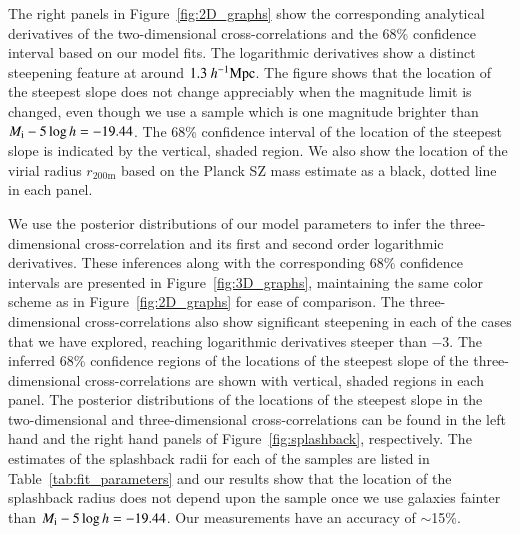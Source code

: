 \documentclass[iop, apjl, twocolappendix, numberedappendix]{emulateapj}
\def\mpch{h^{-1}{\rm Mpc}}
\begin{document}
The right panels in Figure~\ref{fig:2D_graphs} show the
corresponding analytical derivatives of the two-dimensional
cross-correlations and the 68\% confidence interval based on our
model fits. The logarithmic derivatives show a distinct steepening
feature at around $1.3~\mpch$. The figure shows that the
location of the steepest slope does not change appreciably when the
magnitude limit is changed, even though we use a sample which is one
magnitude brighter than $M_{\rm i}-5\log h=-19.44$. The 68\%
confidence interval of the location of the steepest slope is
indicated by the vertical, shaded region. We also show the location
of the virial radius $r_{\mathrm{200m}}$ based on the Planck SZ mass estimate 
as a black, dotted line in each panel.

We use the posterior distributions of our model parameters to infer
the three-dimensional cross-correlation and its first and second order logarithmic
derivatives. These inferences along with the corresponding 68\%
confidence intervals are presented in Figure~\ref{fig:3D_graphs},
maintaining the same color scheme as in Figure~\ref{fig:2D_graphs}
for ease of comparison. The three-dimensional cross-correlations
also show significant steepening in each of the cases that we have
explored, reaching logarithmic derivatives steeper than $-3$. The
inferred 68\% confidence regions of the locations of the steepest
slope of the three-dimensional cross-correlations are shown with
vertical, shaded regions in each panel. The posterior
distributions of the locations of the steepest slope in the
two-dimensional and three-dimensional cross-correlations can be
found in the left hand and the right hand panels of
Figure~\ref{fig:splashback}, respectively. The estimates of the splashback radii
for each of the samples are listed in Table~\ref{tab:fit_parameters}
and our results show that the location of the splashback radius does
not depend upon the sample once we use galaxies fainter than $M_{\rm
i}-5\log h=-19.44$. Our measurements have an accuracy of $\sim$15\%.
\end{document}
